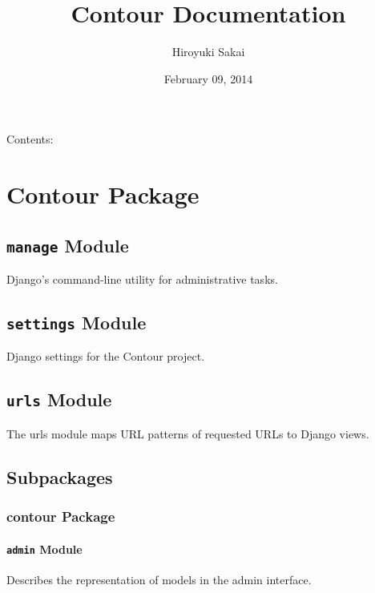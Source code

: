 \documentclass[letterpaper,10pt,english]{sphinxmanual}
\title{Contour Documentation}
\date{February 09, 2014}
\author{Hiroyuki Sakai}
\begin{document}
\maketitle
\tableofcontents
{}\label{index::doc}


Contents:


\chapter{Contour Package}
\label{Contour:welcome-to-contour-s-documentation}\label{Contour:contour-package}\label{Contour::doc}

\section{\texttt{manage} Module}
\label{Contour:manage-module}\label{Contour:module-Contour.manage}
Django's command-line utility for administrative tasks.


\section{\texttt{settings} Module}
\label{Contour:module-Contour.settings}\label{Contour:settings-module}
Django settings for the Contour project.


\section{\texttt{urls} Module}
\label{Contour:module-Contour.urls}\label{Contour:urls-module}
The urls module maps URL patterns of requested URLs to Django views.


\section{Subpackages}
\label{Contour:subpackages}

\subsection{contour Package}
\label{Contour.contour:contour-package}\label{Contour.contour::doc}

\subsubsection{\texttt{admin} Module}
\label{Contour.contour:admin-module}\label{Contour.contour:module-Contour.contour.admin}
Describes the representation of models in the admin interface.
\end{document}
